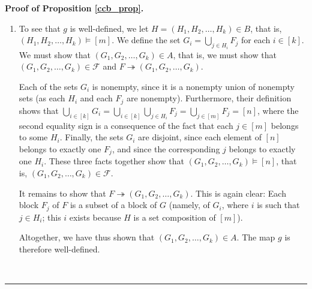\documentclass[12pt]{article}
\theoremstyle{definition}%
\theoremstyle{definition}%
\theoremstyle{remark}%
\newcommand{\tup}[1]{\left( #1 \right)}
\newcommand{\interval}[1]{\left[ #1 \right]} %
\newcommand{\CF}{\mathcal{F}}
\newcommand{\con}{\twoheadrightarrow} %
\newenvironment{proof}[1][Proof]{\noindent\textbf{#1.} }{\ \rule{0.5em}{0.5em}}
\begin{document}
\begin{proof}[Proof of Proposition \ref{ccb_prop}]
\begin{enumerate}
	Finally, we claim that the sets $H_i$ are nonempty.
	Indeed, let $i \in \interval{k}$. Then, the block $G_i$ is nonempty, so there exists some $x \in G_i$. Pick this $x$, and let $F_j$ be the block of $F$ that contains $x$. From $F \con G$, we see that $F_j$ is a subset of \textbf{some} $G_p$. This $G_p$ must then satisfy $x \in F_j \subseteq G_p$ and thus $x \in G_p \cap G_i$ (since $x \in G_i$), so that $G_p \cap G_i \neq \varnothing$, which is impossible unless $p = i$ (since different blocks of $G$ are disjoint). Hence, $p = i$, so that $F_j \subseteq G_p = G_i$.
	Therefore, $j \in H_i$, and thus $H_i$ is nonempty.
	
	Thus we have shown that the sets $H_i$ are disjoint and nonempty and satisfy $\bigcup_{i \in \interval{k}} H_i = \interval{m}$. In other words, $\tup{H_1, H_2, \ldots, H_k} \models \interval{m}$.
	This shows that $f$ is well-defined.
	
	\item To see that $g$ is well-defined, we let $H = \tup{H_1, H_2, \ldots, H_k} \in B$, that is, $\tup{H_1, H_2, \ldots, H_k} \models \interval{m}$.
	We define the set $G_i = \bigcup_{j \in H_{i}} F_{j}$ for each $i \in \interval{k}$.
	We must show that $\tup{G_1, G_2, \ldots, G_k} \in A$, that is, we must show that $\tup{G_1, G_2, \ldots, G_k} \in \CF$ and $F \con \tup{G_1, G_2, \ldots, G_k}$.
	
	Each of the sets $G_i$ is nonempty, since it is a nonempty union of nonempty sets (as each $H_i$ and each $F_j$ are nonempty).
	Furthermore, their definition shows that
	$\bigcup_{i \in \interval{k}} G_i
	= \bigcup_{i \in \interval{k}} \bigcup_{j \in H_i} F_j
	= \bigcup_{j \in \interval{m}} F_j
	= \interval{n}$,
	where the second equality sign is a consequence of the fact that each $j \in \interval{m}$ belongs to some $H_i$.
	Finally, the sets $G_i$ are disjoint, since each element of $\interval{n}$ belongs to exactly one $F_j$, and since the corresponding $j$ belongs to exactly one $H_i$.
	These three facts together show that $\tup{G_1, G_2, \ldots, G_k} \models \interval{n}$, that is, $\tup{G_1, G_2, \ldots, G_k} \in \CF$.
	
	It remains to show that $F \con \tup{G_1, G_2, \ldots, G_k}$.
	This is again clear: Each block $F_j$ of $F$ is a subset of a block of $G$ (namely, of $G_i$, where $i$ is such that $j \in H_i$; this $i$ exists because $H$ is a set composition of $\interval{m}$).
	
	Altogether, we have thus shown that $\tup{G_1, G_2, \ldots, G_k} \in A$.
	The map $g$ is therefore well-defined.
	\end{enumerate}
	

\end{proof}
\end{document}
